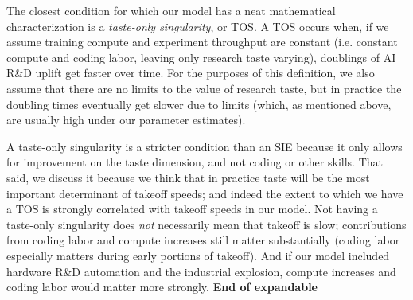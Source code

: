 \documentclass{article}
\theoremstyle{definition}
\begin{document}


The closest condition for which our model has a neat mathematical characterization is a \textit{taste-only singularity}, or TOS. A TOS occurs when, if we assume training compute and experiment throughput are constant (i.e. constant compute and coding labor, leaving only research taste varying), doublings of AI R\&D uplift get faster over time. For the purposes of this definition, we also assume that there are no limits to the value of research taste, but in practice the doubling times eventually get slower due to limits (which, as mentioned above, are usually high under our parameter estimates).

A taste-only singularity is a stricter condition than an SIE because it only allows for improvement on the taste dimension, and not coding or other skills. That said, we discuss it because we think that in practice taste will be the most important determinant of takeoff speeds; and indeed the extent to which we have a TOS is strongly correlated with takeoff speeds in our model. Not having a taste-only singularity does \emph{not} necessarily mean that takeoff is slow; contributions from coding labor and compute increases still matter substantially (coding labor especially matters during early portions of takeoff). And if our model included hardware R\&D automation and the industrial explosion, compute increases and coding labor would matter more strongly. \textbf{End of expandable}

\end{document}
